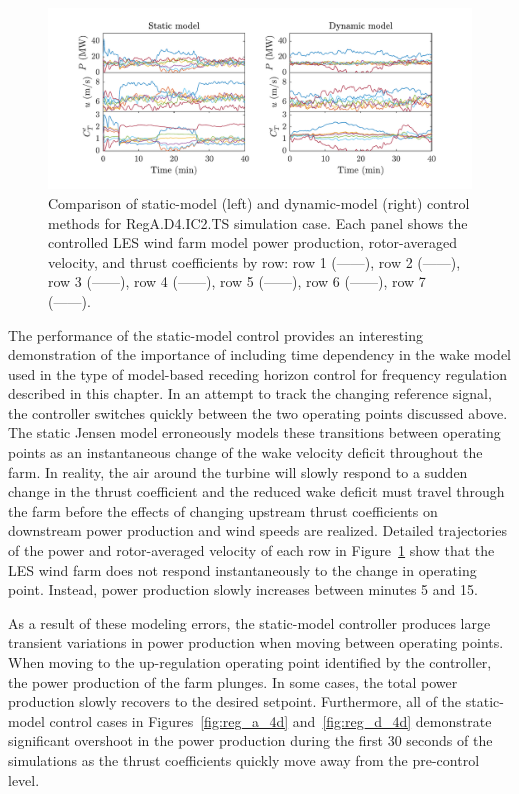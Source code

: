 \begin{figure}[b!]
\begin{center}
\includegraphics[width=\textwidth]{./fig/f7.pdf}
\end{center}
\caption{\label{fig:reg_a_4d-all} Comparison of static-model (left) and dynamic-model (right) control methods for RegA.D4.IC2.TS simulation case. Each panel shows the controlled LES wind farm model power production, rotor-averaged velocity, and thrust coefficients by row: row  1 ({\color{co1}------}), row  2 ({\color{co2}------}), row  3 ({\color{co3}------}), row  4 ({\color{co4}------}), row  5 ({\color{co5}------}), row  6 ({\color{co6}------}), row  7 ({\color{co7}------}).}\end{figure}

The performance of the static-model control provides an interesting demonstration of the importance of including time dependency in the wake model used in the type of model-based receding horizon control for frequency regulation described in this chapter. In an attempt to track the changing reference signal, the controller switches quickly between the two operating points discussed above. The static Jensen model erroneously models these transitions between operating points as an instantaneous change of the wake velocity deficit throughout the farm. In reality, the air around the turbine will slowly respond to a sudden change in the thrust coefficient and the reduced wake deficit must travel through the farm before the effects of changing upstream thrust coefficients on downstream power production and wind speeds are realized. Detailed trajectories of the power and rotor-averaged velocity of each row in Figure~\ref{fig:reg_a_4d-all}  show that the LES wind farm does not respond instantaneously to the change in operating point. Instead, power production slowly increases between minutes 5 and 15.

As a result of these modeling errors, the static-model controller produces large transient variations in power production when moving between operating points. When moving to the up-regulation operating point identified by the controller, the power production of the farm plunges. In some cases, the total power production slowly recovers to the desired setpoint. Furthermore, all of the static-model control cases in Figures~\ref{fig:reg_a_4d} and~\ref{fig:reg_d_4d} demonstrate significant overshoot in the power production during the first 30 seconds of the simulations as the thrust coefficients quickly move away from the pre-control level. 

